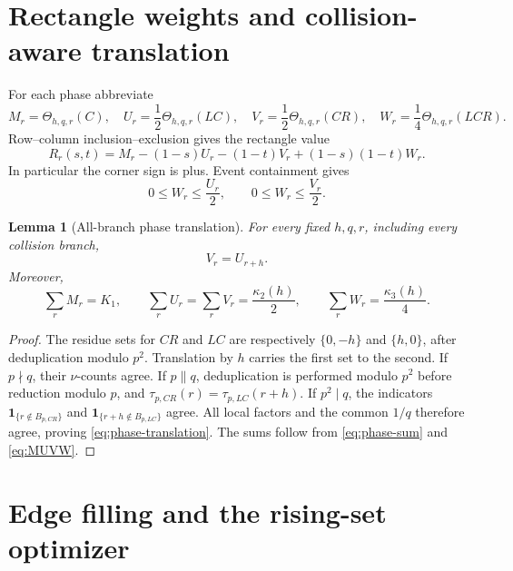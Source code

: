\documentclass[11pt]{article}
\newtheorem{lemma}[theorem]{Lemma}
\theoremstyle{definition}
\theoremstyle{remark}
\newcommand{\ind}{\mathbf 1}
\begin{document}
\section{Rectangle weights and collision-aware translation}

For each phase abbreviate
\begin{equation}
 M_r=\Theta_{h,q,r}(C),\quad
 U_r=\frac12\Theta_{h,q,r}(LC),\quad
 V_r=\frac12\Theta_{h,q,r}(CR),\quad
 W_r=\frac14\Theta_{h,q,r}(LCR).
 \label{eq:MUVW}
\end{equation}
Row--column inclusion--exclusion gives the rectangle value
\begin{equation}
 R_r(s,t)=M_r-(1-s)U_r-(1-t)V_r+(1-s)(1-t)W_r.
 \label{eq:rectangle-value}
\end{equation}
In particular the corner sign is plus.  Event containment gives
\begin{equation}
 0\leq W_r\leq\frac{U_r}{2},\qquad
 0\leq W_r\leq\frac{V_r}{2}.
 \label{eq:weight-bounds}
\end{equation}

\begin{lemma}[All-branch phase translation]
\label{lem:phase-translation}
For every fixed \(h,q,r\), including every collision branch,
\begin{equation}
 V_r=U_{r+h}.
 \label{eq:phase-translation}
\end{equation}
Moreover,
\begin{equation}
 \sum_rM_r=K_1,\qquad
 \sum_rU_r=\sum_rV_r=\frac{\kappa_2(h)}2,\qquad
 \sum_rW_r=\frac{\kappa_3(h)}4.
 \label{eq:phase-weight-sums}
\end{equation}
\end{lemma}

\begin{proof}
The residue sets for \(CR\) and \(LC\) are respectively
\(\{0,-h\}\) and \(\{h,0\}\), after deduplication modulo \(p^2\).
Translation by \(h\) carries the first set to the second.  If \(p\nmid q\),
their \(\nu\)-counts agree.  If \(p\parallel q\), deduplication is performed
modulo \(p^2\) before reduction modulo \(p\), and
\(\tau_{p,CR}(r)=\tau_{p,LC}(r+h)\).  If \(p^2\mid q\), the indicators
\(\ind_{\{r\notin B_{p,CR}\}}\) and
\(\ind_{\{r+h\notin B_{p,LC}\}}\) agree.  All local factors and the common
\(1/q\) therefore agree, proving \eqref{eq:phase-translation}.  The sums
follow from \eqref{eq:phase-sum} and \eqref{eq:MUVW}.
\end{proof}

\section{Edge filling and the rising-set optimizer}
\end{document}
